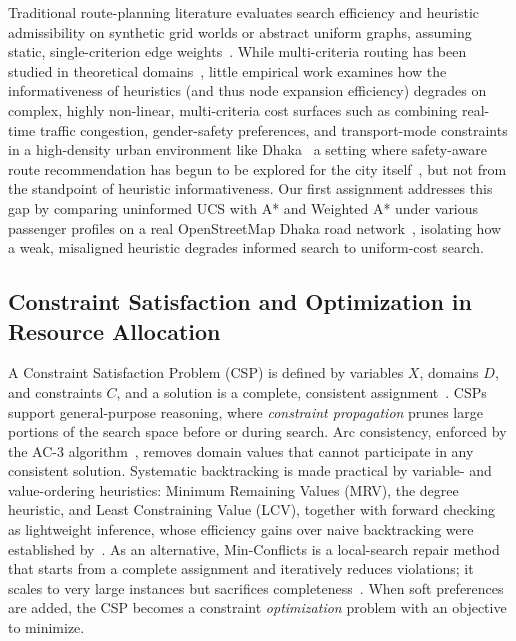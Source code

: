 \documentclass{ai-lab-report}
\begin{document}
Traditional route-planning literature evaluates search efficiency and heuristic admissibility on synthetic grid worlds or abstract uniform graphs, assuming static, single-criterion edge weights~\citep{russell2021ai}. While multi-criteria routing has been studied in theoretical domains~\citep{ma2020heuristic}, little empirical work examines how the informativeness of heuristics (and thus node expansion efficiency) degrades on complex, highly non-linear, multi-criteria cost surfaces  such as combining real-time traffic congestion, gender-safety preferences, and transport-mode constraints in a high-density urban environment like Dhaka~\citep{worldbank2018dhaka}  a setting where safety-aware route recommendation has begun to be explored for the city itself~\citep{hossain2022spafe}, but not from the standpoint of heuristic informativeness. Our first assignment addresses this gap by comparing uninformed UCS with A* and Weighted A* under various passenger profiles on a real OpenStreetMap Dhaka road network~\citep{boeing2017osmnx}, isolating how a weak, misaligned heuristic degrades informed search to uniform-cost search.

\subsection{Constraint Satisfaction and Optimization in Resource Allocation}
A Constraint Satisfaction Problem (CSP) is defined by variables $X$, domains $D$, and constraints $C$, and a solution is a complete, consistent assignment~\citep{dechter2003constraint,russell2021ai,kumar1992algorithms}. CSPs support general-purpose reasoning, where \emph{constraint propagation} prunes large portions of the search space before or during search. Arc consistency, enforced by the AC-3 algorithm~\citep{mackworth1977consistency}, removes domain values that cannot participate in any consistent solution. Systematic backtracking is made practical by variable- and value-ordering heuristics: Minimum Remaining Values (MRV), the degree heuristic, and Least Constraining Value (LCV), together with forward checking as lightweight inference, whose efficiency gains over naive backtracking were established by~\citet{haralick1980increasing}. As an alternative, Min-Conflicts is a local-search repair method that starts from a complete assignment and iteratively reduces violations; it scales to very large instances but sacrifices completeness~\citep{minton1992minconflicts}. When soft preferences are added, the CSP becomes a constraint \emph{optimization} problem with an objective to minimize.
\end{document}
